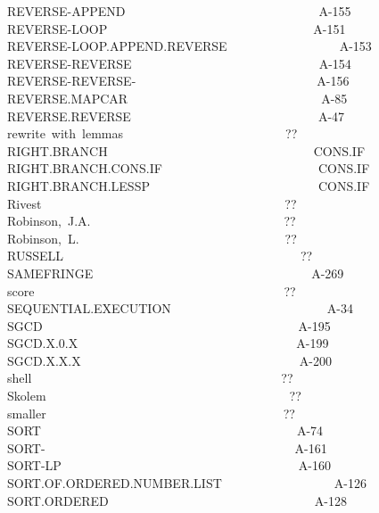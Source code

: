 \documentclass[11pt]{book}
\newenvironment{pubasis}{\begin{flushleft}\ttfamily\small}{\normalsize\rmfamily\end{flushleft}}
\begin{document}
\begin{pubasis}
REVERSE-APPEND~~~~~~~~~~~~~~~~~~~~~~~~~~~~~~~A-155\\
REVERSE-LOOP~~~~~~~~~~~~~~~~~~~~~~~~~~~~~~~~~A-151\\
REVERSE-LOOP.APPEND.REVERSE~~~~~~~~~~~~~~~~~~A-153\\
REVERSE-REVERSE~~~~~~~~~~~~~~~~~~~~~~~~~~~~~~A-154\\
REVERSE-REVERSE-~~~~~~~~~~~~~~~~~~~~~~~~~~~~~A-156\\
REVERSE.MAPCAR~~~~~~~~~~~~~~~~~~~~~~~~~~~~~~~A-85\\
REVERSE.REVERSE~~~~~~~~~~~~~~~~~~~~~~~~~~~~~~A-47\\
rewrite~with~lemmas~~~~~~~~~~~~~~~~~~~~~~~~~~??\\
RIGHT.BRANCH~~~~~~~~~~~~~~~~~~~~~~~~~~~~~~~~~CONS.IF\\
RIGHT.BRANCH.CONS.IF~~~~~~~~~~~~~~~~~~~~~~~~~CONS.IF\\
RIGHT.BRANCH.LESSP~~~~~~~~~~~~~~~~~~~~~~~~~~~CONS.IF\\
Rivest~~~~~~~~~~~~~~~~~~~~~~~~~~~~~~~~~~~~~~~??\\
Robinson,~J.A.~~~~~~~~~~~~~~~~~~~~~~~~~~~~~~~??\\
Robinson,~L.~~~~~~~~~~~~~~~~~~~~~~~~~~~~~~~~~??\\
RUSSELL~~~~~~~~~~~~~~~~~~~~~~~~~~~~~~~~~~~~~~??\\
SAMEFRINGE~~~~~~~~~~~~~~~~~~~~~~~~~~~~~~~~~~~A-269\\
score~~~~~~~~~~~~~~~~~~~~~~~~~~~~~~~~~~~~~~~~??\\
SEQUENTIAL.EXECUTION~~~~~~~~~~~~~~~~~~~~~~~~~A-34\\
SGCD~~~~~~~~~~~~~~~~~~~~~~~~~~~~~~~~~~~~~~~~~A-195\\
SGCD.X.0.X~~~~~~~~~~~~~~~~~~~~~~~~~~~~~~~~~~~A-199\\
SGCD.X.X.X~~~~~~~~~~~~~~~~~~~~~~~~~~~~~~~~~~~A-200\\
shell~~~~~~~~~~~~~~~~~~~~~~~~~~~~~~~~~~~~~~~~??\\
Skolem~~~~~~~~~~~~~~~~~~~~~~~~~~~~~~~~~~~~~~~??\\
smaller~~~~~~~~~~~~~~~~~~~~~~~~~~~~~~~~~~~~~~??\\
SORT~~~~~~~~~~~~~~~~~~~~~~~~~~~~~~~~~~~~~~~~~A-74\\
SORT-~~~~~~~~~~~~~~~~~~~~~~~~~~~~~~~~~~~~~~~~A-161\\
SORT-LP~~~~~~~~~~~~~~~~~~~~~~~~~~~~~~~~~~~~~~A-160\\
SORT.OF.ORDERED.NUMBER.LIST~~~~~~~~~~~~~~~~~~A-126\\
SORT.ORDERED~~~~~~~~~~~~~~~~~~~~~~~~~~~~~~~~~A-128\\

\end{pubasis}
\end{document}
